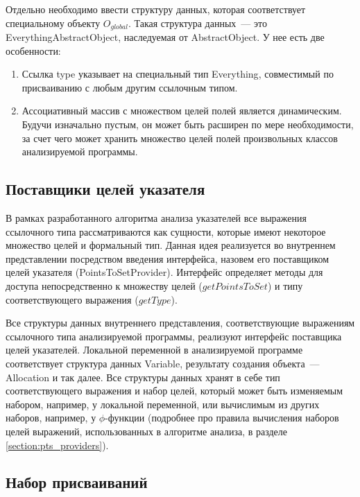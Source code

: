 \documentclass[14pt,titlepage]{extarticle}
\let\oldphi\phi
\renewcommand{\phi}{\ensuremath{\oldphi}}
\newcommand{\eng}[1]{{\English#1}}
\begin{document}
      Отдельно необходимо ввести структуру данных, которая соответствует
      специальному объекту $O_{global}$. Такая структура данных~--- это
      \eng{Everything\-Abstract\-Object}, наследуемая от \eng{AbstractObject}.
      У нее есть две особенности:
      \begin{enumerate}
        \item Ссылка \eng{type} указывает на специальный тип \eng{Everything},
              совместимый по присваиванию с любым другим ссылочным типом.
        \item Ассоциативный массив с множеством целей полей является
              динамическим. Будучи изначально пустым, он может быть расширен
              по мере необходимости, за счет чего может хранить множество целей
              полей произвольных классов анализируемой программы.
      \end{enumerate}

    \subsection{Поставщики целей указателя}

      В рамках разработанного алгоритма анализа указателей все выражения
      ссылочного типа рассматриваются как сущности, которые имеют некоторое
      множество целей и формальный тип.
      Данная идея реализуется во внутреннем представлении посредством введения
      интерфейса, назовем его поставщиком целей указателя
      (\eng{PointsToSetProvider}).
      Интерфейс определяет методы для доступа непосредственно к множеству целей
      ($getPointsToSet$) и типу соответствующего выражения ($getType$).

      Все структуры данных внутреннего представления, соответствующие выражениям
      ссылочного типа анализируемой программы, реализуют интерфейс поставщика
      целей указателей.
      Локальной переменной в анализируемой программе соответствует структура
      данных \eng{Variable}, результату создания объекта~--- \eng{Allocation} и
      так далее.
      Все структуры данных хранят в себе тип соответствующего выражения и набор
      целей, который может быть изменяемым набором, например, у локальной
      переменной, или вычислимым из других наборов, например, у \phi-функции
      (подробнее про правила вычисления наборов целей выражений, использованных
      в алгоритме анализа, в разделе \ref{section:pts_providers}).

    \subsection{Набор присваиваний}
\end{document}
